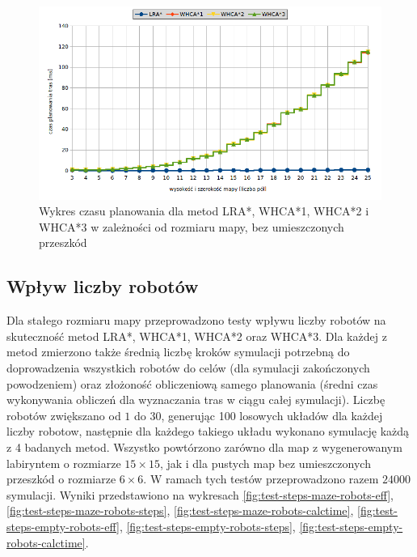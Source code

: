 \begin{figure}
	\centering
	\includegraphics[width=0.8\columnwidth]{img/plots/test-steps-empty-mapsize-calctime}
	\caption{Wykres czasu planowania dla metod LRA*, WHCA*1, WHCA*2 i WHCA*3 w zależności od rozmiaru mapy, bez umieszczonych przeszkód}
	\label{fig:test-steps-empty-mapsize-calctime}
\end{figure}


\subsection{Wpływ liczby robotów} %
\label{ch:tests-function-robots}
Dla stałego rozmiaru mapy przeprowadzono testy wpływu liczby robotów na skuteczność metod LRA*, WHCA*1, WHCA*2 oraz WHCA*3.
Dla każdej z metod zmierzono także średnią liczbę kroków symulacji potrzebną do doprowadzenia wszystkich robotów do celów (dla symulacji zakończonych powodzeniem) oraz złożoność obliczeniową samego planowania (średni czas wykonywania obliczeń dla wyznaczania tras w ciągu całej symulacji).
Liczbę robotów zwiększano od $1$ do $30$, generując 100 losowych układów dla każdej liczby robotow, następnie dla każdego takiego układu wykonano symulację każdą z 4 badanych metod.
Wszystko powtórzono zarówno dla map z wygenerowanym labiryntem o rozmiarze $15 \times 15$, jak i dla pustych map bez umieszczonych przeszkód o rozmiarze $6 \times 6$.
W ramach tych testów przeprowadzono razem $24 000$ symulacji.
Wyniki przedstawiono na wykresach \ref{fig:test-steps-maze-robots-eff}, \ref{fig:test-steps-maze-robots-steps}, \ref{fig:test-steps-maze-robots-calctime}, \ref{fig:test-steps-empty-robots-eff}, \ref{fig:test-steps-empty-robots-steps}, \ref{fig:test-steps-empty-robots-calctime}.


